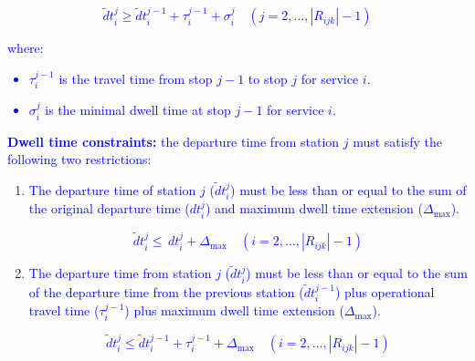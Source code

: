 \documentclass[Afour,sagev,times]{sagej}
\newcommand{\primero}[1]{\textcolor{blue}{#1}}
\begin{document}

\primero{
\begin{equation}
\tilde dt_{i}^{j} \geq \tilde dt_{i}^{j-1} + \tau_{i}^{j-1} + \sigma_{i}^{j}
\quad
(j=2,\dots, |R_{ijk}| - 1)
\end{equation}
}

\primero{
where:
\begin{itemize}
  \item $ \tau_{i}^{j-1}$ is the travel time from stop $j-1$ to stop $j$ for service $i$.
  \item $\sigma_{i}^{j}$ is the minimal dwell time at stop $j-1$ for service $i$.
\end{itemize}
}

\primero{\textbf{Dwell time constraints: }the departure time from station $j$ must satisfy the following two restrictions: }

\begin{enumerate}
    \item \primero{The departure time of station $ j $ ($  \tilde dt_{i}^{j} $) must be less than or equal to the sum of the original departure time ($ dt_{i}^{j} $) and maximum dwell time extension ($ \Delta_{\max} $).
    }

    \primero{
    \begin{equation}
    \tilde dt_{i}^{j} \leq
    \,dt_{i}^{j} + \Delta_{\max} \quad
    (i=2,\dots,|R_{ijk}| - 1)
    \end{equation}
    }

    
    \item \primero{The departure time from station $ j $ ($  \tilde dt_{i}^{j} $) must be less than or equal to the sum of the departure time from the previous station ($ \tilde dt_{i}^{j-1} $) plus operational travel time  ($ \tau_{i}^{j-1} $) plus maximum dwell time extension ($ \Delta_{\max} $).}

    \primero{
    \begin{equation}
    \tilde dt_{i}^{j} \leq
    \tilde dt_{i}^{j-1} + \tau_{i}^{j-1} + \Delta_{\max}
    \quad
    (i=2,\dots,|R_{ijk}| - 1)
    \end{equation}
    }
\end{enumerate}
\end{document}
